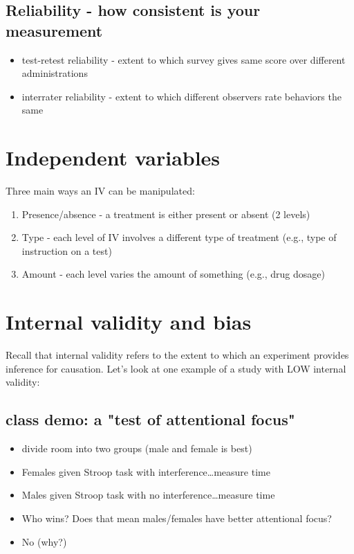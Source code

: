\documentclass[11pt]{article}
\begin{document}
\subsection*{Reliability - how consistent is your measurement}
\label{sec-1-3}
\begin{itemize}
\item test-retest reliability - extent to which survey gives same score over different administrations
\item interrater reliability - extent to which different observers rate behaviors the same
\end{itemize}

\section*{Independent variables}
\label{sec-2}

Three main ways an IV can be manipulated:
\begin{enumerate}
\item Presence/absence - a treatment is either present or absent (2 levels)
\item Type - each level of IV involves a different type of treatment (e.g., type of instruction on a test)
\item Amount - each level varies the amount of something (e.g., drug dosage)
\end{enumerate}

\section*{Internal validity and bias}
\label{sec-3}
Recall that internal validity refers to the extent to which an experiment provides inference for causation.
Let's look at one example of a study with LOW internal validity:

\subsection*{class demo: a "test of attentional focus"}
\label{sec-3-1}
\begin{itemize}
\item divide room into two groups (male and female is best)
\item Females given Stroop task with interference\ldots{}measure time
\item Males given Stroop task with no interference\ldots{}measure time
\item Who wins?  Does that mean males/females have better attentional focus?
\item No (why?)
\end{itemize}
\end{document}
